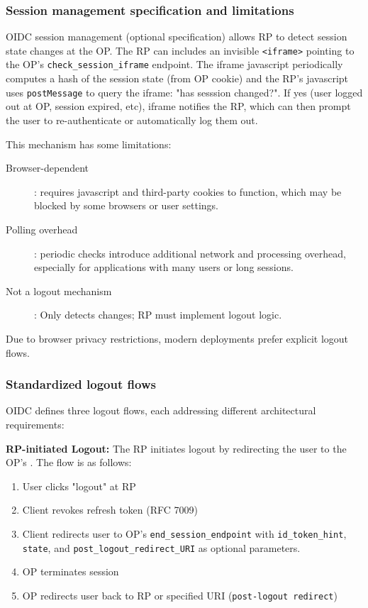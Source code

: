 \documentclass[../memoire.tex]{subfiles}
\begin{document}
\subsubsection*{Session management specification and limitations}

OIDC session management (optional specification) allows RP to detect session state changes at the OP. The RP can includes an invisible \texttt{<iframe>} pointing to the OP's \texttt{check\_session\_iframe} endpoint. The iframe javascript periodically computes a hash of the session state (from OP cookie) and the RP's javascript uses \texttt{postMessage} to query the iframe: "has sesssion changed?". If yes (user logged out at OP, session expired, etc), iframe notifies the RP, which can then prompt the user to re-authenticate or automatically log them out.

This mechanism has some limitations:
\begin{description}
  \item[Browser-dependent]: requires javascript and third-party cookies to function, which may be blocked by some browsers or user settings.
  \item[Polling overhead]: periodic checks introduce additional network and processing overhead, especially for applications with many users or long sessions.
  \item[Not a logout mechanism]: Only detects changes; RP must implement logout logic.
\end{description}

Due to browser privacy restrictions, modern deployments prefer explicit logout flows.

\subsubsection*{Standardized logout flows}

OIDC defines three logout flows, each addressing different architectural requirements\cite{ibmOauth2}:

\textbf{RP-initiated Logout:}
The RP initiates logout by redirecting the user to the OP's \texttt{}. The flow is as follows:
\begin{enumerate}
  \item User clicks "logout" at RP
  \item Client revokes refresh token (RFC 7009)
  \item Client redirects user to OP's \texttt{end\_session\_endpoint} with \texttt{id\_token\_hint}, \texttt{state}, and \texttt{post\_logout\_redirect\_URI} as optional parameters.
  \item OP terminates session 
  \item OP redirects user back to RP or specified URI (\texttt{post-logout redirect})
\end{enumerate}
\end{document}
